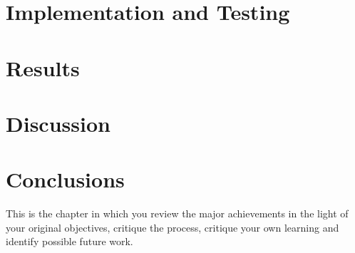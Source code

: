 \documentclass[11pt,openright,twoside,a4paper]{report}
\begin{document}
\chapter{Implementation and Testing}








\chapter{Results}


\chapter{Discussion}


\chapter{Conclusions}


This is the chapter in which you review the major achievements in the
light of your original objectives, critique the process, critique your
own learning and identify possible future work.







\end{document}
